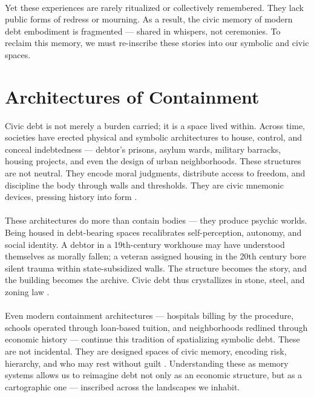 \documentclass[12pt]{article}
\begin{document}
\paragraph{} Yet these experiences are rarely ritualized or collectively remembered. They lack public forms of redress or mourning. As a result, the civic memory of modern debt embodiment is fragmented — shared in whispers, not ceremonies. To reclaim this memory, we must re-inscribe these stories into our symbolic and civic spaces.

\section{Architectures of Containment}

Civic debt is not merely a burden carried; it is a space lived within. Across time, societies have erected physical and symbolic architectures to house, control, and conceal indebtedness — debtor’s prisons, asylum wards, military barracks, housing projects, and even the design of urban neighborhoods. These structures are not neutral. They encode moral judgments, distribute access to freedom, and discipline the body through walls and thresholds. They are civic mnemonic devices, pressing history into form \parencite{foucault1977discipline, gilmore2007golden}.

\paragraph{} These architectures do more than contain bodies — they produce psychic worlds. Being housed in debt-bearing spaces recalibrates self-perception, autonomy, and social identity. A debtor in a 19th-century workhouse may have understood themselves as morally fallen; a veteran assigned housing in the 20th century bore silent trauma within state-subsidized walls. The structure becomes the story, and the building becomes the archive. Civic debt thus crystallizes in stone, steel, and zoning law \parencite{smith2001contours}.

\paragraph{} Even modern containment architectures — hospitals billing by the procedure, schools operated through loan-based tuition, and neighborhoods redlined through economic history — continue this tradition of spatializing symbolic debt. These are not incidental. They are designed spaces of civic memory, encoding risk, hierarchy, and who may rest without guilt \parencite{coates2015between}. Understanding these as memory systems allows us to reimagine debt not only as an economic structure, but as a cartographic one — inscribed across the landscapes we inhabit.
\end{document}
